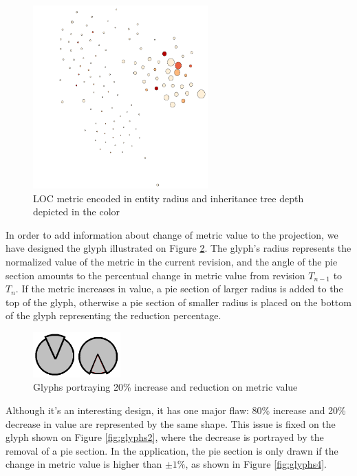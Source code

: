 \begin{figure}[H]
  \centering
  \includegraphics[width=0.6\textwidth]{figures/max_inh_tree.png}
  \caption{LOC metric encoded in entity radius and inheritance tree depth depicted in the color}
  \label{fig:max_inh_tree}
\end{figure}

In order to add information about change of metric value to the projection, we have designed the glyph illustrated on Figure \ref{fig:glyphs1}. The glyph's radius represents the normalized value of the metric in the current revision, and the angle of the pie section amounts to the percentual change in metric value from revision $T_{n-1}$ to $T_{n}$. If the metric increases in value, a pie section of larger radius is added to the top of the glyph, otherwise a pie section of smaller radius is placed on the bottom of the glyph representing the reduction percentage.

\begin{figure}[H]
  \centering
  \includegraphics[width=0.3\textwidth]{figures/glyphs_1.png}
  \caption{Glyphs portraying 20\% increase and reduction on metric value}
  \label{fig:glyphs1}
\end{figure}

Although it's an interesting design, it has one major flaw: 80\% increase and 20\% decrease in value are represented by the same shape. This issue is fixed on the glyph shown on Figure \ref{fig:glyphs2}, where the decrease is portrayed by the removal of a pie section. In the application, the pie section is only drawn if the change in metric value is higher than $\pm1\%$, as shown in Figure \ref{fig:glyphs4}.

